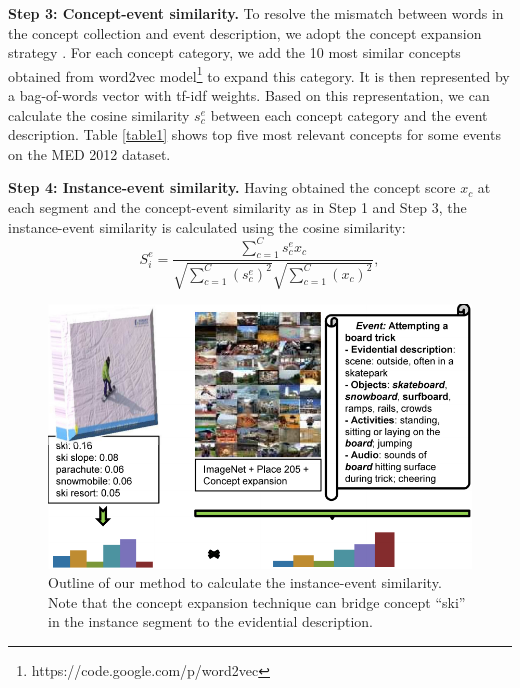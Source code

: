 \textbf{Step 3: Concept-event similarity.} To resolve the mismatch between words in the concept collection and event description, we adopt the concept expansion strategy \cite{chen2014event}. For each concept category, we add the 10 most similar concepts obtained from word2vec\cite{mikolov2013efficient} model\footnote{https://code.google.com/p/word2vec} to expand this category. It is then represented by a bag-of-words vector with tf-idf weights. Based on this representation, we can calculate the cosine similarity $s_{c}^{e}$ between each concept category and the event description. Table \ref{table1} shows top five most relevant concepts for some events on the MED 2012 dataset.   

\textbf{Step 4: Instance-event similarity.} Having obtained the concept score $x_{c}$ at each segment and the concept-event similarity as in Step 1 and Step 3, the instance-event similarity is calculated using the cosine similarity:
\begin{equation}
\label{eq1}
S_{i}^{e}=\frac{\sum_{c=1}^{C}s_{c}^{e}x_{c}}{\sqrt{\sum_{c=1}^{C}(s_{c}^{e})^{2}}\sqrt{\sum_{c=1}^{C}(x_{c})^{2}}},
\end{equation}
\begin{figure}
	\centering
	\includegraphics[width=1\textwidth]{figure_2.pdf}
	\caption{Outline of our method to calculate the instance-event similarity. Note that the concept expansion technique can bridge concept ``ski'' in the instance segment to the evidential description.}
	\label{figure_2}
\end{figure}


